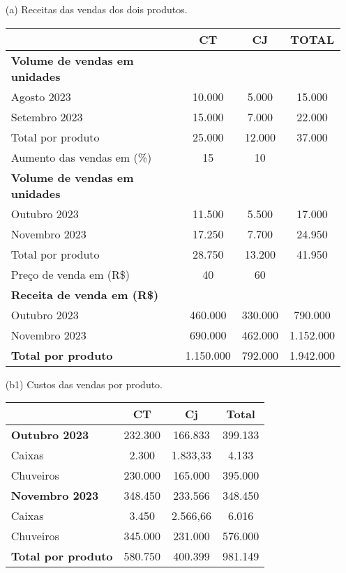 \documentclass[report]{uftex}
\begin{document}
\begin{itemize}
	
\item[(a)] Receitas das vendas dos dois produtos. 

\begin{table}[h]
	\centering
	\begin{tabular}{l|c|c|c}
		\hline
		 & \textbf{CT} & \textbf{CJ} & \textbf{TOTAL} \\ 
		\hline
		\textbf{Volume de vendas em unidades} &  &  &  \\
		\hline
		Agosto 2023 & 10.000 & 5.000 & 15.000 \\
		\hline
		Setembro 2023 & 15.000 & 7.000 & 22.000 \\
		\hline
		Total por produto & 25.000 & 12.000 & 37.000 \\
		\hline
		Aumento das vendas em (\%) & 15 & 10 & \\
		\hline 
		\textbf{Volume de vendas em unidades} & & & \\
		\hline
		Outubro 2023 & 11.500 & 5.500 & 17.000 \\
		\hline
		Novembro 2023 & 17.250 & 7.700 & 24.950 \\ 
		\hline 
		Total por produto & 28.750 & 13.200 & 41.950 \\
		\hline
		Preço de venda em (R\$) & 40 & 60 & \\
		\hline 
		\textbf{Receita de venda em (R\$)} &  & & \\
		\hline 
		Outubro 2023 & 460.000 & 330.000 & 790.000 \\
		\hline 
		Novembro 2023 & 690.000 & 462.000 & 1.152.000 \\
		\textbf{Total por produto} & 1.150.000 & 792.000 & 1.942.000 \\
	\end{tabular}
\end{table}

\item[(b1)] Custos das vendas por produto.

 \begin{table}[h]
 	\centering
 	\begin{tabular}{l|c|c|c}
 		\hline
 		& \textbf{CT} & \textbf{Cj} & \textbf{Total} \\ 
 		\hline
 		\textbf{Outubro 2023} & 232.300 & 166.833 & 399.133 \\
 		\hline
 		Caixas & 2.300 & 1.833,33 & 4.133 \\
 		\hline
 		Chuveiros & 230.000 & 165.000 & 395.000 \\
 		\hline
 		\textbf{Novembro 2023} & 348.450 & 233.566 & 348.450 \\
 		\hline
 		Caixas & 3.450 & 2.566,66 & 6.016 \\
 		\hline
 		Chuveiros & 345.000 & 231.000 & 576.000 \\
 		\hline
 		\textbf{Total por produto} & 580.750 & 400.399 & 981.149 \\
	\end{tabular}
\end{table}



\end{itemize}
\end{document}
